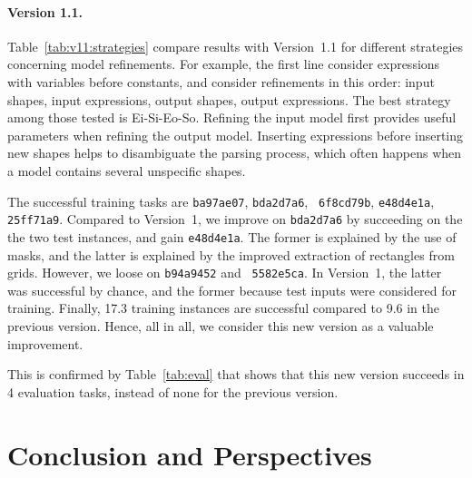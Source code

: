 \documentclass[a4paper]{llncs}
\begin{document}
\paragraph{Version 1.1.}  Table~\ref{tab:v11:strategies} compare
results with Version~1.1 for different strategies concerning model
refinements. For example, the first line consider expressions with
variables before constants, and consider refinements in this order:
input shapes, input expressions, output shapes, output expressions.
The best strategy among those tested is Ei-Si-Eo-So. Refining the
input model first provides useful parameters when refining the output
model. Inserting expressions before inserting new shapes helps to
disambiguate the parsing process, which often happens when a model
contains several unspecific shapes.

The successful training tasks are {\tt ba97ae07}, {\tt bda2d7a6}, {\tt
  6f8cd79b}, {\tt e48d4e1a}, {\tt 25ff71a9}. Compared to Version~1, we
improve on {\tt bda2d7a6} by succeeding on the the two test instances,
and gain {\tt e48d4e1a}. The former is explained by the use of masks,
and the latter is explained by the improved extraction of rectangles
from grids.
%
However, we loose on {\tt b94a9452} and {\tt
  5582e5ca}. In Version~1, the latter was successful by chance, and
the former because test inputs were considered for training.
%
Finally, 17.3 training instances are successful compared to 9.6 in the
previous version. Hence, all in all, we consider this new version as a
valuable improvement.

This is confirmed by Table~\ref{tab:eval} that shows that this new
version succeeds in 4 evaluation tasks, instead of none for the
previous version.

\section{Conclusion and Perspectives}
\label{conclu}



\end{document}
